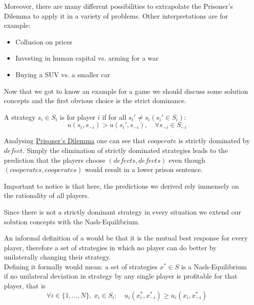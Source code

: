 Moreover, there are many different possibilities to extrapolate the Prisoner's Dilemma to apply it in a variety of problems. Other interpretations are for example:
\begin{itemize}
	\item Collusion on prices
	\item Investing in human capital vs. arming for a war
	\item Buying a SUV vs. a smaller car
\end{itemize}

Now that we got to know an example for a game we should discuss some solution concepts and the first obvious choice is the strict dominance.

\begin{definition}
	A strategy $s_{i} \in S_{i}$ is  for player $i$ if for all $s_{i}' \neq s_{i} (s_{i}'  \in S_{i})$: 
	\[ u(s_{i}, s_{-i}) > u(s_{i}', s_{-i}), \quad \forall s_{-i} \in S_{-i} \]	
\end{definition}

Analysing \hyperref[prisonersdilemma]{Prisoner's Dilemma} one can see that $cooperate$ is strictly dominated by $defect$. Simply the elimination of strictly dominated strategies leads to the prediction that the players choose $(defects, defects)$ even though $(cooperates, cooperates)$ would result in a lower prison sentence. 



Important to notice is that here, the predictions we derived rely immensely on the rationality of all players.

Since there is not a strictly dominant strategy in every situation we extend our solution concepts with the Nash-Equilibrium.

\begin{definition} \label{nashequilibrium} %
	An informal definition of a  would be that it is the mutual best response for every player, therefore a set of strategies in which no player can do better by unilaterally changing their strategy. \\
	Defining it formally would mean: a set of strategies $x^{*} \in S$ is a Nash-Equilibrium if no unilateral deviation in strategy by any single player is profitable for that player, that is
	\[ \forall i \in \{1, \dotsc, N \},~ x_{i} \in S_{i} : \quad u_{i}(x_{i}^{*}, x_{-i}^{*}) \geq u_{i}(x_{i}, x_{-i}^{*}) \]
	\end{definition}

